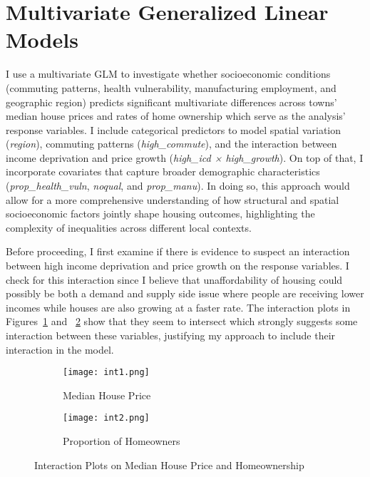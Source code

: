 \documentclass[12pt]{article}
\begin{document}
\section{Multivariate Generalized Linear Models}

I use a multivariate GLM to investigate whether socioeconomic conditions (commuting patterns, health vulnerability, manufacturing employment, and geographic region) predicts significant multivariate differences across towns' median house prices and rates of home ownership which serve as the analysis' response variables. I include categorical predictors to model spatial variation (\textit{region}), commuting patterns (\textit{high\_commute}), and the interaction between income deprivation and price growth (\textit{high\_icd × high\_growth}). On top of that, I incorporate covariates that capture broader demographic characteristics (\textit{prop\_health\_vuln}, \textit{noqual}, and \textit{prop\_manu}). In doing so, this approach would allow for a more comprehensive understanding of how structural and spatial socioeconomic factors jointly shape housing outcomes, highlighting the complexity of inequalities across different local contexts. 

Before proceeding, I first examine if there is evidence to suspect an interaction between high income deprivation and price growth on the response variables. I check for this interaction since I believe that unaffordability of housing could possibly be both a demand and supply side issue where people are receiving lower incomes while houses are also growing at a faster rate. The interaction plots in Figures~\ref{fig:int1} and ~\ref{fig:int2} show that they seem to intersect which strongly suggests some interaction between these variables, justifying my approach to include their interaction in the model. 

\begin{figure}[H]
    \centering
    \begin{subfigure}[b]{0.45\linewidth}
        \centering
        \texttt{[image: int1.png]}
        \caption{Median House Price}
        \label{fig:int1}
    \end{subfigure}
    \hfill
    \begin{subfigure}[b]{0.45\linewidth}
        \centering
        \texttt{[image: int2.png]}
        \caption{Proportion of Homeowners}
        \label{fig:int2}
    \end{subfigure}
    \caption{Interaction Plots on Median House Price and Homeownership}
    \label{fig:interaction_plots}
\end{figure}
\end{document}
